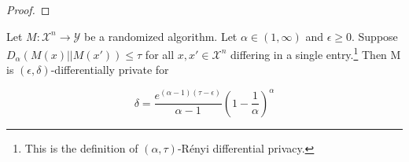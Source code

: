 \documentclass{article}
\begin{document}
\begin{lemma}
\begin{proof}





\end{proof}

\end{lemma}

\begin{theorem}
\label{renyidp-approxdp-delta}
\cite{CKS20} Let $M: \mathcal{X}^n \rightarrow \mathcal{Y}$ be a randomized algorithm. Let $\alpha \in (1, \infty)$ and $\epsilon \geq 0$. Suppose $D_\alpha(M(x) || M(x')) \leq \tau$ for all $x, x' \in \mathcal{X}^n$ differing in a single entry.\footnote{This is the definition of $(\alpha, \tau)$-R\'enyi differential privacy.} Then M is $(\epsilon, \delta)$-differentially private for

\begin{equation}
    \delta = \frac{e^{(\alpha - 1) (\tau - \epsilon)}}{\alpha - 1} \left(1 - \frac{1}{\alpha}\right)^\alpha
\end{equation}
\end{theorem}
\end{document}
